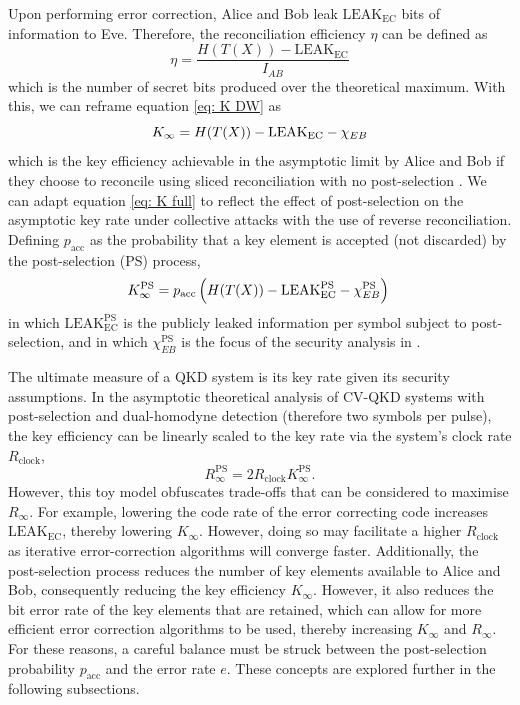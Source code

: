 ﻿\documentclass[12pt]{article}
\begin{document}
Upon performing error correction, Alice and Bob leak $\text{LEAK}_{\text{EC}}$ bits of information to Eve. Therefore, the reconciliation efficiency $\eta$ can be defined as
\begin{equation}
  \label{eq: eta}
  \eta = \frac{H(T(X)) - \text{LEAK}_{\text{EC}}}{I_{AB}}
\end{equation}
which is the number of secret bits produced over the theoretical maximum. With this, we can reframe equation \eqref{eq: K DW} as
\begin{equation}
  \label{eq: K full}
  K_\infty = H(T(X)) - \text{LEAK}_{\text{EC}} - \chi_{EB} \\
\end{equation}
which is the key efficiency achievable in the asymptotic limit by Alice and Bob if they choose to reconcile using sliced reconciliation with no post-selection \cite{VanAssche-2004}. We can adapt equation \eqref{eq: K full} to reflect the effect of post-selection on the asymptotic key rate under collective attacks with the use of reverse reconciliation. Defining $p_\text{acc}$ as the probability that a key element is accepted (not discarded) by the post-selection (PS) process,
\begin{equation}
  \label{eq: K ORSR}
  K_{\infty}^\text{PS} = p_\text{acc}\left(H(T(X)) - \text{LEAK}_{\text{EC}}^\text{PS} - \chi_{EB}^\text{PS}\right) \\
\end{equation}
in which $\text{LEAK}_\text{EC}^\text{PS}$ is the publicly leaked information per symbol subject to post-selection, and in which $\chi_{EB}^\text{PS}$ is the focus of the security analysis in .

The ultimate measure of a QKD system is its key rate given its security assumptions. In the asymptotic theoretical analysis of CV-QKD systems with post-selection and dual-homodyne detection (therefore two symbols per pulse), the key efficiency can be linearly scaled to the key rate via the system's clock rate $R_\text{clock}$,
\begin{equation}
R_\infty^\text{PS} = 2R_\text{clock}K_\infty^\text{PS}.
\end{equation}
However, this toy model obfuscates trade-offs that can be considered to maximise $R_\infty$. For example, lowering the code rate of the error correcting code increases $\text{LEAK}_\text{EC}$, thereby lowering $K_\infty$. However, doing so may facilitate a higher $R_\text{clock}$ as iterative error-correction algorithms will converge faster. Additionally, the post-selection process reduces the number of key elements available to Alice and Bob, consequently reducing the key efficiency $K_\infty$. However, it also reduces the bit error rate of the key elements that are retained, which can allow for more efficient error correction algorithms to be used, thereby increasing $K_\infty$ and $R_\infty$. For these reasons, a careful balance must be struck between the post-selection probability $p_\text{acc}$ and the error rate $e$. These concepts are explored further in the following subsections.
\end{document}
